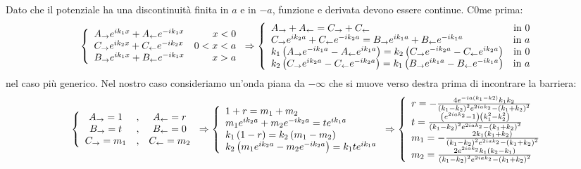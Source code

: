 Dato che il potenziale ha una discontinuit\`a finita in $a$ e in $-a$, funzione e derivata devono essere continue. C0me prima:
\begin{equation}
	\lr\{.{\begin{array}{lr}
		A_\to e^{ik_1x} + A_\from e^{-ik_1x}	&	x<0\\
		C_\to e^{ik_2x} + C_\from e^{-ik_2x}	&	0<x<a\\
		B_\to e^{ik_1x} + B_\from e^{-ik_1x}	&	x>a
	\end{array}}\Rightarrow\lr\{.{\begin{array}{lr}
		A_\to  +A_\from = C_\to+C_\from															&	\text{in }0\\
		C_\to e^{ik_2a}+C_\from e^{-ik_2a} = B_\to e^{ik_1a} +B_\from e^{-ik_1a}				&	\text{in }a\\
		k_1\lrt{A_\to e^{-ik_1a}-A_\from e^{ik_1a}}=k_2\lrt{C_\to e^{-ik_2a}-C_\from e^{ik_2a}}	&	\text{in }0\\
		k_2\lrt{C_\to e^{ik_2a}-C_\from e^{-ik_2a}}=k_1\lrt{B_\to e^{ik_1a}-B_\from e^{-ik_1a}}	&	\text{in }a
	\end{array}}
\end{equation}
nel caso pi\`u generico. Nel nostro caso consideriamo un'onda piana da $-\infty$ che si muove verso destra prima di incontrare la barriera:
\begin{equation}
\lr\{.{\begin{array}{ccc}
	A_\to = 1&,&
	A_\from = r\\
	B_\to = t&,&
	B_\from=0\\
	C_\to = m_1&,&
	C_\from=m_2
	\end{array}} \Rightarrow\lr\{.{\begin{array}{l}
	1+r= m_1 +m_2 \\
	m_1 e^{ik_2a}+m_2 e^{-ik_2a} = t e^{ik_1a}\\
	k_1\lrt{1 - r}=k_2\lrt{m_1 - m_2}\\
	k_2\lrt{m_1 e^{ik_2a}-m_2 e^{-ik_2a}}=k_1 t e^{ik_1a}
	\end{array}} \Rightarrow\lr\{.{\begin{array}{l}
	r = -\frac{4 e^{-i a \lrt{k_1-k2}} k_1 k_2}{\lrt{k_1-k_2}^2 e^{2 i a k_2}-\lrt{k_1+k_2}^2}\\
	t = \frac{\lrt{e^{2 i a k_2}-1}\lrt{k_1^2-k_2^2}}{\lrt{k_1-k_2}^2 e^{2 i a k_2}-\lrt{k_1+k_2}^2}\\
	m_1 = -\frac{2k_1\lrt{k_1+k_2}}{\lrt{k_1-k_2}^2 e^{2 i a k_2}-\lrt{k_1+k_2}^2}\\
	m_2 = \frac{2 e^{2 i a k_2}k_1\lrt{k_2-k_1}}{\lrt{k_1-k_2}^2 e^{2 i a k_2}-\lrt{k_1+k_2}^2}
	\end{array}}
\end{equation}

